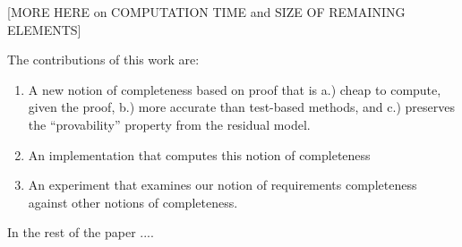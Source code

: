 [MORE HERE on COMPUTATION TIME and SIZE OF REMAINING ELEMENTS]

The contributions of this work are:
\begin{enumerate}
\item A new notion of completeness based on proof that is a.) cheap to compute, given the proof, b.) more accurate than test-based methods, and c.) preserves the ``provability'' property from the residual model.
\item An implementation that computes this notion of completeness
\item An experiment that examines our notion of requirements completeness against other notions of completeness.
\end{enumerate}

In the rest of the paper ....

